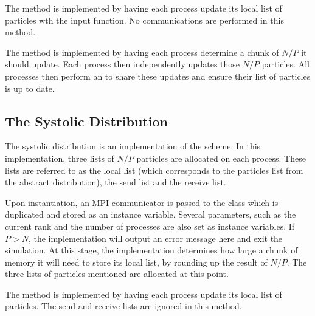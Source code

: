 The \individualoperation{} method is implemented by having each process update
its local list of particles wth the input function.
%
No communications are performed in this method.

The \pairoperation{} method is implemented by having each process
determine a chunk of $N/P$ it should update.
%
Each process then independently updates those $N/P$ particles.
%
All processes then perform an \mpiallgatherv{} to share these
updates and ensure their list of particles is up to date.


\subsection{The Systolic Distribution}

%
The systolic distribution is an implementation of the \systolicloop{} scheme.
%
In this implementation, three lists of $N/P$ particles are allocated
on each process.
%
These lists are referred to as the local list (which corresponds to
the particles list from the abstract distribution), the send list and the
receive list.

Upon instantiation, an MPI communicator is passed to the class
which is duplicated and stored as an instance variable.
%
Several parameters, such as the current rank and the number of
processes are also set as instance variables.
%
If $P > N$, the implementation will output an error message
here and exit the simulation.
%
At this stage, the implementation determines how large a chunk of
memory it will need to store its local list, by rounding up
the result of $N/P$.
%
The three lists of particles mentioned are allocated at this point.

The \individualoperation{} method is implemented by having each process
update its local list of particles.
%
The send and receive lists are ignored in this method.


